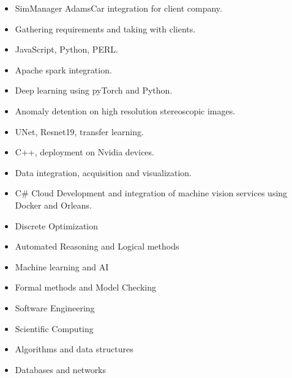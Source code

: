 \documentclass[10pt,a4paper,ragged2e,withhyper]{altacv}
\begin{document}
\begin{paracol}{2}

\begin{itemize}
\item SimManager AdamsCar integration for client company.
\item Gathering requirements and taking with clients.
\item JavaScript, Python, PERL.
\item Apache spark integration.
\end{itemize}

\divider

\begin{itemize}
\item Deep learning using pyTorch and Python.
\item Anomaly detention on high resolution stereoscopic images.
\item UNet, Resnet19, transfer learning.
\item C++, deployment on Nvidia devices.
\item Data integration, acquisition and visualization.
\item C\# Cloud Development and integration of machine vision services using Docker and Orleans. 
\end{itemize}


\begin{itemize}
\item Discrete Optimization
\item Automated Reasoning and Logical methods
\item Machine learning and AI
\item Formal methods and Model Checking
\end{itemize}

\divider

\begin{itemize}
\item Software Engineering
\item Scientific Computing
\item Algorithms and data structures
\item Databases and networks
\end{itemize}
\medskip


\end{paracol}
\end{document}
